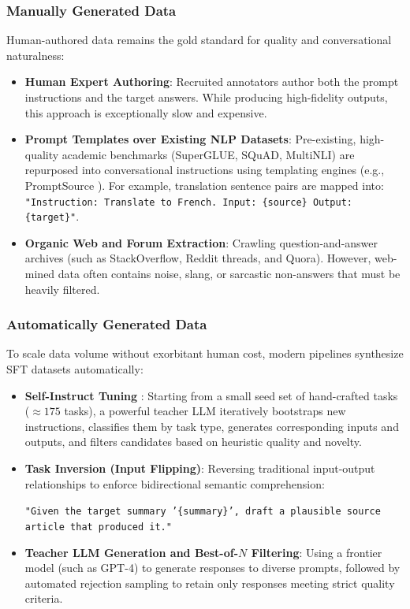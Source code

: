 \documentclass[../../../main.tex]{subfiles}
\begin{document}
\subsubsection{Manually Generated Data}
Human-authored data remains the gold standard for quality and conversational naturalness:
\begin{itemize}
    \item \textbf{Human Expert Authoring}: Recruited annotators author both the prompt instructions and the target answers. While producing high-fidelity outputs, this approach is exceptionally slow and expensive.
    \item \textbf{Prompt Templates over Existing NLP Datasets}: Pre-existing, high-quality academic benchmarks (SuperGLUE, SQuAD, MultiNLI) are repurposed into conversational instructions using templating engines (e.g., PromptSource \citep{bach2022promptsource}). For example, translation sentence pairs are mapped into: \texttt{"Instruction: Translate to French. Input: \{source\} Output: \{target\}"}.
    \item \textbf{Organic Web and Forum Extraction}: Crawling question-and-answer archives (such as StackOverflow, Reddit threads, and Quora). However, web-mined data often contains noise, slang, or sarcastic non-answers that must be heavily filtered.
\end{itemize}

\subsubsection{Automatically Generated Data}
To scale data volume without exorbitant human cost, modern pipelines synthesize SFT datasets automatically:
\begin{itemize}
    \item \textbf{Self-Instruct Tuning} \citep{wang2023selfinstruct}: Starting from a small seed set of hand-crafted tasks ($\approx 175$ tasks), a powerful teacher LLM iteratively bootstraps new instructions, classifies them by task type, generates corresponding inputs and outputs, and filters candidates based on heuristic quality and novelty.
    \item \textbf{Task Inversion (Input Flipping)}: Reversing traditional input-output relationships to enforce bidirectional semantic comprehension:
    \begin{center}
    \texttt{"Given the target summary '\{summary\}', draft a plausible source article that produced it."}
    \end{center}
    \item \textbf{Teacher LLM Generation and Best-of-$N$ Filtering}: Using a frontier model (such as GPT-4) to generate responses to diverse prompts, followed by automated rejection sampling to retain only responses meeting strict quality criteria.
\end{itemize}
\end{document}

